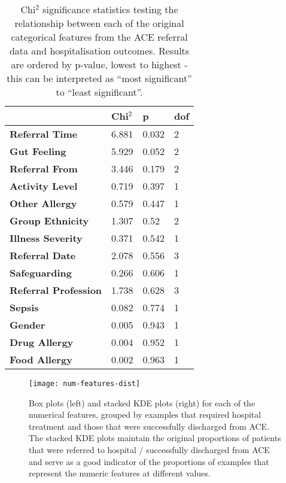 \begin{table}[H]
    \centering
    \scriptsize
    \renewcommand{\arraystretch}{1.1}
    \caption[Chi$^2$ tests between categorical features and hospitalisation]{Chi$^2$ significance statistics testing the relationship between each of the original categorical features from the ACE referral data and hospitalisation outcomes. Results are ordered by p-value, lowest to highest - this can be interpreted as ``most significant'' to ``least significant''.}
    \label{tab:chi2-stats}
    \begin{tabular}{llll}
        \toprule
        & \textbf{Chi$^2$} & \textbf{p} & \textbf{dof} \\\toprule
        \textbf{Referral Time} & 6.881 & 0.032 & 2 \\
        \textbf{Gut Feeling} & 5.929 & 0.052 & 2 \\
        \textbf{Referral From} & 3.446 & 0.179 & 2 \\
        \textbf{Activity Level} & 0.719 & 0.397 & 1 \\
        \textbf{Other Allergy} & 0.579 & 0.447 & 1 \\
        \textbf{Group Ethnicity} & 1.307 & 0.52 & 2 \\
        \textbf{Illness Severity} & 0.371 & 0.542 & 1 \\
        \textbf{Referral Date} & 2.078 & 0.556 & 3 \\
        \textbf{Safeguarding} & 0.266 & 0.606 & 1 \\
        \textbf{Referral Profession} & 1.738 & 0.628 & 3 \\
        \textbf{Sepsis} & 0.082 & 0.774 & 1 \\
        \textbf{Gender} & 0.005 & 0.943 & 1 \\
        \textbf{Drug Allergy} & 0.004 & 0.952 & 1 \\
        \textbf{Food Allergy} & 0.002 & 0.963 & 1 \\\toprule
    \end{tabular}
\end{table}

\begin{figure}[H]
    \caption[Box and KDE plots of numerical features]{Box plots (left) and stacked KDE plots (right) for each of the numerical features, grouped by examples that required hospital treatment and those that were successfully discharged from ACE. The stacked KDE plots maintain the original proportions of patients that were referred to hospital / successfully discharged from ACE and serve as a good indicator of the proportions of examples that represent the numeric features at different values.}
    \label{fig:num-features-dist}
    \centering
    \texttt{[image: num-features-dist]}
\end{figure}

